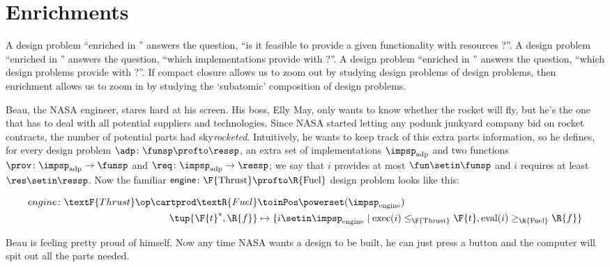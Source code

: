 
\section{Enrichments}
\label{sec:enriched}


A design problem ``enriched in \Bool'' answers the question, ``is it feasible to provide a given functionality \fun with resources \res?''.
A design problem ``enriched in \Set'' answers the question, ``which implementations provide \fun with \res?''.
A design problem ``enriched in \DP'' answers the question, ``which design problems provide \fun with \res?''.
If compact closure allows us to zoom out by studying design problems of design problems, then enrichment allows us to zoom in by studying the `subatomic' composition of design problems.

\begin{example}
    \label{ex:dpi_example}
    Beau, the NASA engineer, stares hard at his screen.
    His boss, Elly May, only wants to know whether the rocket will fly, but he's the one that has to deal with all potential suppliers and technologies.
    Since NASA started letting any podunk junkyard company bid on rocket contracts, the number of potential parts had sky\emph{rocketed}.
    Intuitively, he wants to keep track of this extra parts information, so he defines, for every design problem $\adp \colon \funsp \profto \ressp$, an extra set of implementations $\impsp_\text{adp}$ and two functions $\prov\colon \impsp_\text{adp} \to \funsp$ and  $\req\colon \impsp_\text{adp} \to \ressp$; we say that $i$ provides at most $\fun \setin \funsp$ and $i$ requires at least $\res \setin \ressp$.
    Now the familiar $\mathsf{engine} \colon \F{\text{Thrust}} \profto \R{\text{Fuel}}$ design problem looks like this:
    \begin{widepar}
        \begin{equation*}
            \begin{aligned}
                engine \colon \textF{Thrust}\op \cartprod \textR{Fuel} & \toinPos \powerset(\impsp_\text{engine}) \\
                \tup{\F{t}^*,\R{f}}                                    & \mapsto \{ i \setin \impsp_\text{engine} \mid \text{exec}(i) \leq_\F{\text{Thrust}} \F{t}, \text{eval}(i) \geq_\R{\text{Fuel}} \R{f} \}
            \end{aligned}
        \end{equation*}
    \end{widepar}
    Beau is feeling pretty proud of himself.
    Now any time NASA wants a design to be built, he can just press a button and the computer will spit out all the parts needed.
\end{example}

